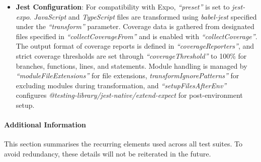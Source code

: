 \begin{itemize}
    \item \textbf{Jest Configuration}: For compatibility with Expo, \textit{``preset''} is set to \textit{jest-expo}. \textit{JavaScript} and \textit{TypeScript} files are transformed using \textit{babel-jest} specified under the \textit{``transform''} parameter. Coverage data is gathered from designated files specified in \textit{``collectCoverageFrom''} and is enabled with \textit{``collectCoverage''}. The output format of coverage reports is defined in \textit{``coverageReporters''}, and strict coverage thresholds are set through \textit{``coverageThreshold''} to 100\% for branches, functions, lines, and statements. Module handling is managed by \textit{``moduleFileExtensions''} for file extensions, \textit{transformIgnorePatterns''} for excluding modules during transformation, and \textit{``setupFilesAfterEnv''} configures \textit{@testing-library/jest-native/extend-expect} for post-environment setup.
\end{itemize}

\paragraph{Additional Information}

This section summarises the recurring elements used across all test suites. To avoid redundancy, these details will not be reiterated in the future.

